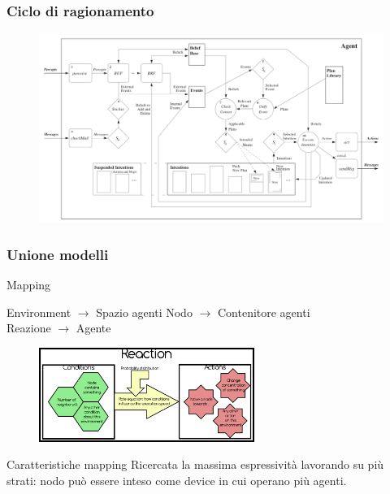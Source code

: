 \documentclass[handout]{beamer}\mode<presentation>{\usetheme{AMSCesenaBleu}}
\begin{document}
\begin{frame}
\frametitle{Ciclo di ragionamento}
\begin{figure}
\hspace*{-0.35cm}
\includegraphics[width=12.5cm]{images/reasoningCicle.png}
\end{figure}
\end{frame}

\begin{frame}
\frametitle{Unione modelli}
\begin{block}{Mapping}
\begin{center}
\alert{Environment} $\rightarrow$ Spazio agenti \hspace{1.5cm} \alert{Nodo} $\rightarrow$ Contenitore agenti \\
\alert{Reazione} $\rightarrow$ Agente
\end{center}
\end{block}
\begin{figure}
\includegraphics[width=7cm]{images/alchemistReaction.png}
\end{figure}

\begin{block}{Caratteristiche mapping}
Ricercata la massima espressività lavorando su più strati: nodo può essere inteso come device in cui operano più agenti.
\end{block}




\end{frame}
\end{document}
